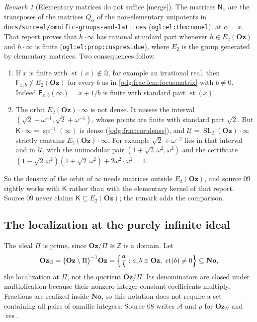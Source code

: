 \documentclass[11pt,oneside]{article}
\numberwithin{equation}{section}
\theoremstyle{definition}
\theoremstyle{remark}
\newtheorem{remark}[remark]{Remark}
\newcommand{\No}{\mathbf{No}}
\newcommand{\Oz}{\mathbf{Oz}}
\newcommand{\Z}{\mathbb Z}
\newcommand{\Q}{\mathbb Q}
\newcommand{\ct}{\operatorname{ct}}
\newcommand{\SL}{\operatorname{SL}}
\newcommand{\mergetag}{\textup{\textsf{\small[merge]}}}
\newcommand{\replabel}[1]{\nolinkurl{#1}}
\newcommand{\fn}[1]{\nolinkurl{#1}}
\newcommand{\st}{\operatorname{st}}
\newcommand{\spz}{\operatorname{sp}}
\newcommand{\res}{\operatorname{res}}
\newcommand{\Ureg}{\mathcal U}
\newcommand{\Kcong}{\mathsf K}
\begin{document}
\begin{remark}[Elementary matrices do not suffice \mergetag]\label{odg:frac:rem:elementary}
The matrices $\mathsf N_x$ are the transposes of the matrices $Q_\alpha$ of the
non-elementary unipotents in \fn{docs/surreal/omnific-groups-and-lattices}
(\replabel{ogl:el:thm:nonel}), at $\alpha=x$. That report proves that
$h\cdot\infty$ has rational standard part whenever $h\in E_2(\Oz)$ and
$h\cdot\infty$ is finite (\replabel{ogl:el:prop:cuspresidue}), where $E_2$ is
the group generated by elementary matrices. Two consequences follow.
\begin{enumerate}[label=\textup{(\roman*)},leftmargin=*]
\item If $x$ is finite with $\st(x)\notin\Q$, for example an irrational real,
then $\mathsf F_{x,b}\notin E_2(\Oz)$ for every $b$ as in
\cref{odg:frac:lem:focusmatrix} with $b\ne0$. Indeed
$\mathsf F_{x,b}(\infty)=x+1/b$ is finite with standard part $\st(x)$.
\item The orbit $E_2(\Oz)\cdot\infty$ is not dense. It misses the interval
$(\sqrt2-\omega^{-1},\sqrt2+\omega^{-1})$, whose points are finite with standard
part $\sqrt2$. But $\Kcong\cdot\infty=\spz^{-1}(\infty)$ is dense
(\cref{odg:frac:cor:dense}), and $\Ureg=\SL_2(\Oz)\cdot\infty$ strictly contains
$E_2(\Oz)\cdot\infty$. For example $\sqrt2+\omega^{-2}$ lies in that interval and
in $\Ureg$, with the unimodular pair $(1+\sqrt2\,\omega^2,\omega^2)$ and the
certificate $(1-\sqrt2\,\omega^2)(1+\sqrt2\,\omega^2)+2\omega^2\cdot\omega^2=1$.
\end{enumerate}
So the density of the orbit of $\infty$ needs matrices outside $E_2(\Oz)$, and
source 09 rightly works with $\Kcong$ rather than with the elementary kernel of
that report. Source 09 never claims $\Kcong\subseteq E_2(\Oz)$; the remark adds
the comparison.
\end{remark}

\subsection{The localization at the purely infinite ideal}\label{odg:frac:sub:residues}

The ideal $\Pi$ is prime, since $\Oz/\Pi\cong\Z$ is a domain. Let
\[
 \Oz_\Pi=\bigl(\Oz\setminus\Pi\bigr)^{-1}\Oz
 =\Bigl\{\frac ab:a,b\in\Oz,\ \ct(b)\ne0\Bigr\}\subseteq\No ,
\]
the localization at $\Pi$, not the quotient $\Oz/\Pi$. Its denominators
are closed under multiplication because their nonzero integer constant
coefficients multiply. Fractions are realized inside $\No$, so this notation
does not require a set containing all pairs of omnific integers. Source 08
writes $\mathcal A$ and $\rho$ for $\Oz_\Pi$ and $\res$.
\end{document}

